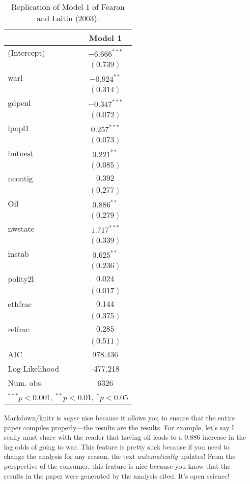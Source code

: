 \documentclass[12pt]{article}\usepackage[]{graphicx}\usepackage[]{color}
\begin{document}
\begin{table}
\begin{center}
\begin{tabular}{l c }
\hline
 & Model 1 \\
\hline
(Intercept)    & $-6.666^{***}$ \\
               & $(0.739)$      \\
warl           & $-0.924^{**}$  \\
               & $(0.314)$      \\
gdpenl         & $-0.347^{***}$ \\
               & $(0.072)$      \\
lpopl1         & $0.257^{***}$  \\
               & $(0.073)$      \\
lmtnest        & $0.221^{**}$   \\
               & $(0.085)$      \\
ncontig        & $0.392$        \\
               & $(0.277)$      \\
Oil            & $0.886^{**}$   \\
               & $(0.279)$      \\
nwstate        & $1.717^{***}$  \\
               & $(0.339)$      \\
instab         & $0.625^{**}$   \\
               & $(0.236)$      \\
polity2l       & $0.024$        \\
               & $(0.017)$      \\
ethfrac        & $0.144$        \\
               & $(0.375)$      \\
relfrac        & $0.285$        \\
               & $(0.511)$      \\
\hline
AIC            & 978.436        \\
Log Likelihood & -477.218       \\
Num. obs.      & 6326           \\
\hline
\multicolumn{2}{l}{\scriptsize{$^{***}p<0.001$, $^{**}p<0.01$, $^*p<0.05$}}
\end{tabular}
\caption{Replication of Model 1 of Fearon and Laitin (2003).}
\label{table:coefficients}
\end{center}
\end{table}


Markdown/knitr is \emph{super} nice because it allows you to ensure that the
entire paper compiles properly---the results are the results. For example,
let's say I really must share with the reader that having oil leads to a
0.886 increase in the log odds of going to war. This feature is pretty slick because if you need to change the analysis for any reason, the text \emph{automatically} updates! From the perspective of the consumer, this feature is nice because you know that the results in the paper were generated by the analysis cited. It's open science!
\end{document}
